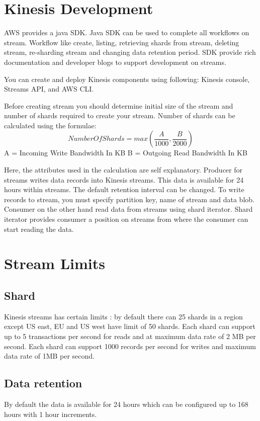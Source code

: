 \documentclass[9pt,twocolumn,twoside]{../../styles/osajnl}
\begin{document}
\section{Kinesis Development}
AWS provides a java SDK. Java SDK \cite{www-kinesis-javasdk} can be used to
complete all workflows on stream. Workflow like create, listing, retrieving
shards from stream, deleting stream, re-sharding stream and changing data
retention period. SDK provide rich documentation and developer blogs to support
development on streams.

You can create and deploy Kinesis components using following:
Kinesis console, Streams API, and AWS CLI.

Before creating stream you should determine initial size of the stream
\cite{www-kinesis-size} and number of shards required to create your stream.
Number of shards can be calculated using the formulae:
\[ Number Of Shards = max( \frac{A}{1000}, \frac{B}{2000} ) \]
\newline
A = Incoming Write Bandwidth In KB
\newline
B = Outgoing Read Bandwidth In KB
\newline

Here, the attributes used in the calculation are self explanatory. 
  Producer for streams writes data records into Kinesis streams. This data is
available for 24 hours within streams. The default retention interval can be
changed. To write records to stream, you must specify partition key, name of
stream and data blob. Consumer on the other hand read data from streams using
shard iterator. Shard iterator provides consumer a position on streams from
where the consumer can start reading the data.

\section{Stream Limits}
\subsection{Shard}
Kinesis streams has certain limits \cite{www-kinesis-limits} : by default there can 25 shards in 
a region except US east, EU and US west have limit of 50 shards. Each shard can support 
up to 5 transactions per second for reads and at maximum data rate of 2 MB per second. 
Each shard can support 1000 records per second for writes and maximum data 
rate of 1MB per second.

\subsection{Data retention}
By default the data is available for 24 hours which can be configured up to 168
hours with 1 hour increments.
\end{document}

